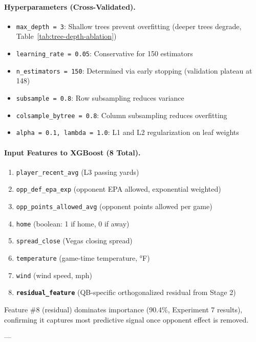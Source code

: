 \paragraph{Hyperparameters (Cross-Validated).}
\begin{itemize}[itemsep=2pt,parsep=0pt]
    \item \texttt{max\_depth = 3}: Shallow trees prevent overfitting (deeper trees degrade, Table~\ref{tab:tree-depth-ablation})
    \item \texttt{learning\_rate = 0.05}: Conservative for 150 estimators
    \item \texttt{n\_estimators = 150}: Determined via early stopping (validation plateau at 148)
    \item \texttt{subsample = 0.8}: Row subsampling reduces variance
    \item \texttt{colsample\_bytree = 0.8}: Column subsampling reduces overfitting
    \item \texttt{alpha = 0.1, lambda = 1.0}: L1 and L2 regularization on leaf weights
\end{itemize}

\paragraph{Input Features to XGBoost (8 Total).}
\begin{enumerate}[itemsep=2pt,parsep=0pt]
    \item \texttt{player\_recent\_avg} (L3 passing yards)
    \item \texttt{opp\_def\_epa\_exp} (opponent EPA allowed, exponential weighted)
    \item \texttt{opp\_points\_allowed\_avg} (opponent points allowed per game)
    \item \texttt{home} (boolean: 1 if home, 0 if away)
    \item \texttt{spread\_close} (Vegas closing spread)
    \item \texttt{temperature} (game-time temperature, °F)
    \item \texttt{wind} (wind speed, mph)
    \item \textbf{\texttt{residual\_feature}} (QB-specific orthogonalized residual from Stage 2)
\end{enumerate}

Feature \#8 (residual) dominates importance (90.4\%, Experiment 7 results), confirming it captures most predictive signal once opponent effect is removed.

---


